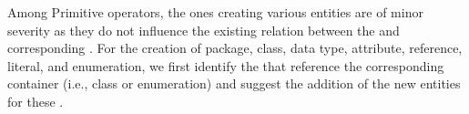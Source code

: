 
Among \textsf{Primitive} operators, the ones creating various entities are of minor severity as they do not influence the existing relation between the \metamodel and corresponding \viewtypes. For the creation of package, class, data type, attribute, reference, literal, and enumeration, we first identify the \viewtypes that reference the corresponding container (i.e., class or enumeration) and suggest the addition of the new entities for these \viewtypes.

